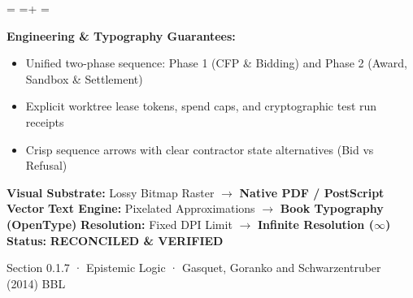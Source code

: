 \documentclass[10pt,a4paper,landscape]{article}
\newcommand{\pdautoscale}[2]{%
  \pdmaxh=#1\relax
  \pdmaxw=#2\relax
  \sbox{\pdscaledbox}{\usebox{\pdfigbox}}%
  \pdcurh=\dimexpr\ht\pdscaledbox+\dp\pdscaledbox\relax
  \pdcurw=\wd\pdscaledbox
  \ifdim\dimexpr\pdcurw * 100 / \pdmaxw\relax > \dimexpr\pdcurh * 100 / \pdmaxh\relax
    \resizebox{\pdmaxw}{!}{\usebox{\pdscaledbox}}%
  \else
    \resizebox{!}{\pdmaxh}{\usebox{\pdscaledbox}}%
  \fi
}
\begin{document}
\begin{minipage}[t]{0.492\linewidth}
  \begin{tcolorbox}[
    colback=pdcobalt!3,colframe=pdcobalt!85!black,arc=1.5pt,
    boxrule=0.7pt,top=1.5pt,bottom=1.5pt,left=4pt,right=4pt,
    title={\pdgrotesk\footnotesize\bfseries \color{white} B. Authoritative Native Vector Replacement \hfill \texttt{.tex / TikZ / PGF}}
  ]
    \begin{minipage}[c][8.3cm][c]{\linewidth}
      \centering
      \sbox{\pdfigbox}{}
      \pdautoscale{8.0cm}{\linewidth}
    \end{minipage}
    \tcblower
    \begin{minipage}[t][2.0cm][t]{\linewidth}
      \pdgrotesk\scriptsize
      \textbf{{\color{pdcobalt} Engineering \& Typography Guarantees:}}\\
      \begin{itemize}[leftmargin=9pt,itemsep=0pt,topsep=0.5pt,parsep=0pt]
        \item Unified two-phase sequence: Phase 1 (CFP \& Bidding) and Phase 2 (Award, Sandbox \& Settlement)
        \item Explicit worktree lease tokens, spend caps, and cryptographic test run receipts
        \item Crisp sequence arrows with clear contractor state alternatives (Bid vs Refusal)
      \end{itemize}
    \end{minipage}
  \end{tcolorbox}
\end{minipage}

\vspace*{0.05cm}
\noindent
\begin{tcolorbox}[
  colback=hhpaper,colframe=hhgray!35,arc=1.5pt,boxrule=0.4pt,
  top=1.5pt,bottom=1.5pt,left=6pt,right=6pt
]
  \pdgrotesk\scriptsize
  \noindent
  \textbf{Visual Substrate:} Lossy Bitmap Raster $\rightarrow$ \textbf{\color{pdcobalt}Native PDF / PostScript Vector}\hfill
  \textbf{Text Engine:} Pixelated Approximations $\rightarrow$ \textbf{\color{pdcobalt}Book Typography (OpenType)}\hfill
  \textbf{Resolution:} Fixed DPI Limit $\rightarrow$ \textbf{\color{pdcobalt}Infinite Resolution ($\infty$)}\hfill
  \textbf{Status:} \textbf{\color{pdteal}RECONCILED \& VERIFIED}
\end{tcolorbox}
\clearpage

\noindent
\begin{minipage}[t]{\linewidth}
  \hfill
  {\pdgrotesk\footnotesize\color{hhgray} Section 0.1.7 · Epistemic Logic · Gasquet, Goranko and Schwarzentruber (2014) BBL}\\
  \vspace*{0.03cm}
  \noindent{\color{hhgray!40}\rule{\linewidth}{0.5pt}}
\end{minipage}
\end{document}
